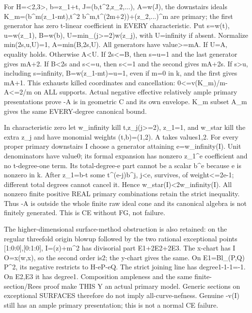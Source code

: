 For H=\textless{}2,3\textgreater{}, b=z\_1+t, J=(b,t\textasciicircum{}2,z\_2,...), A=w(J), the downstairs ideals K\_m=(b\textasciicircum{}m(z\_1-mt),t\textasciicircum{}2 b\textasciicircum{}m,t\textasciicircum{}(2m+2))+(z\_2,...)\textasciicircum{}m are primary; the first generator has zero t-linear coefficient in EVERY characteristic. Put s=w(t), u=w(z\_1), B=w(b), U=min\_(j\textgreater{}=2)w(z\_j), with U=infinity if absent. Normalize min(2s,u,U)=1, A=min(B,2s,U). All generators have value\textgreater{}=mA. If U=A, equality holds. Otherwise A\textless{}U. If 2s\textless{}=B, then s=u=1 and the last generator gives mA+2. If B\textless{}2s and s\textless{}=u, then s\textless{}=1 and the second gives mA+2s. If s\textgreater{}u, including s=infinity, B=w(z\_1-mt)=u=1, even if m=0 in k, and the first gives mA+1. This exhausts killed coordinates and cancellation: 0\textless{}=v(K\_m)/m-A\textless{}=2/m on ALL supports. Actual negative effective relatively ample primary presentations prove -A is in geometric C and its own envelope. K\_m subset A\_m gives the same EVERY-degree canonical bound.

In characteristic zero let w\_infinity kill t,z\_j(j\textgreater{}=2), z\_1=1, and w\_star kill the extra z\_j and have monomial weights (t,b)=(1,2). A takes values1,2. For every proper primary downstairs I choose a generator attaining e=w\_infinity(I). Unit denominators have value0; its formal expansion has nonzero z\_1\textasciicircum{}e coefficient and no t-degree-one term. Its total-degree-e part cannot be a scalar b\textasciicircum{}e because e is nonzero in k. After z\_1=b-t some t\textasciicircum{}(e-j)b\textasciicircum{}j, j\textless{}e, survives, of weight\textless{}=2e-1; different total degrees cannot cancel it. Hence w\_star(I)\textless{}2w\_infinity(I). All nonzero finite positive REAL primary combinations retain the strict inequality. Thus -A is outside the whole finite raw ideal cone and its canonical algebra is not finitely generated. This is CE without FG, not failure.

The higher-dimensional surface-method obstruction is also retained: on the regular threefold origin blowup followed by the two rational exceptional points [1:0:0],[0:1:0], I=(z)+m\textasciicircum{}2 has divisorial part E1+2E2+2E3. The x-chart has I O=x(w,x), so the second order is2; the y-chart gives the same. On E1=Bl\_(P,Q) P\textasciicircum{}2, its negative restricts to H-eP-eQ. The strict joining line has degree1-1-1=-1. On E2,E3 it has degree1. Composition ampleness and the same finite-section/Rees proof make THIS Y an actual primary model. Generic sections on exceptional SURFACES therefore do not imply all-curve-nefness. Genuine -v(I) still has an ample primary presentation; this is not a normal CE failure.

